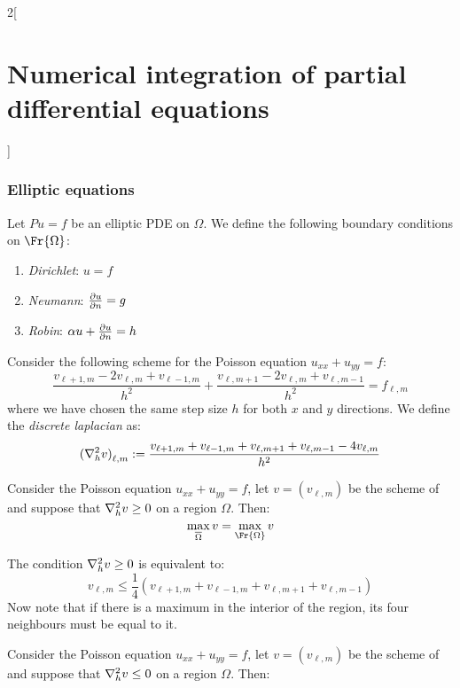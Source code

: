 \documentclass[../../../main_math.tex]{subfiles}
\begin{document}
\begin{multicols}{2}[\section{Numerical integration of partial differential equations}]
  \subsubsection{Elliptic equations}
  \begin{definition}
    Let $Pu=f$ be an elliptic PDE on $\Omega$. We define the following boundary conditions on $\Fr{\Omega}$:
    \begin{enumerate}
      \item \emph{Dirichlet}: $u=f$
      \item \emph{Neumann}: $\pdv{u}{n}=g$
      \item \emph{Robin}: $\alpha u+\pdv{u}{n}=h$
    \end{enumerate}
  \end{definition}
  \begin{definition}
    Consider the following scheme for the Poisson equation $u_{xx}+u_{yy}=f$:
    \begin{equation}\label{NIPDE:poisson_eq}
      \frac{v_{\ell+1,m}-2v_{\ell,m}+v_{\ell-1,m}}{h^2}+\frac{v_{\ell,m+1}-2v_{\ell,m}+v_{\ell,m-1}}{h^2}\!=\!f_{\ell,m}
    \end{equation}
    where we have chosen the same step size $h$ for both $x$ and $y$ directions. We define the \emph{discrete laplacian} as:
    $$
      {(\laplacian_h v)}_{\ell,m}:=\frac{v_{\ell+1,m}+v_{\ell-1,m}+v_{\ell,m+1}+v_{\ell,m-1}-4v_{\ell,m}}{h^2}
    $$
  \end{definition}
  \begin{theorem}\label{NIPDE:maximumPrinc}
    Consider the Poisson equation $u_{xx}+u_{yy}=f$, let $v=(v_{\ell,m})$ be the scheme of  and suppose that $\laplacian_hv\geq 0$ on a region $\Omega$. Then:
    $$\max_{\overline{\Omega}} v=\max_{\Fr{\Omega}} v$$
  \end{theorem}
  \begin{sproof}
    The condition $\laplacian_hv\geq 0$ is equivalent to:
    $$
      v_{\ell,m}\leq \frac{1}{4}(v_{\ell+1,m}+v_{\ell-1,m}+v_{\ell,m+1}+v_{\ell,m-1})
    $$
    Now note that if there is a maximum in the interior of the region, its four neighbours must be equal to it.
  \end{sproof}
  \begin{corollary}\label{NIPDE:minimumPrinc}
    Consider the Poisson equation $u_{xx}+u_{yy}=f$, let $v=(v_{\ell,m})$ be the scheme of  and suppose that $\laplacian_hv\leq 0$ on a region $\Omega$. Then:

\end{corollary}
\end{multicols}
\end{document}
